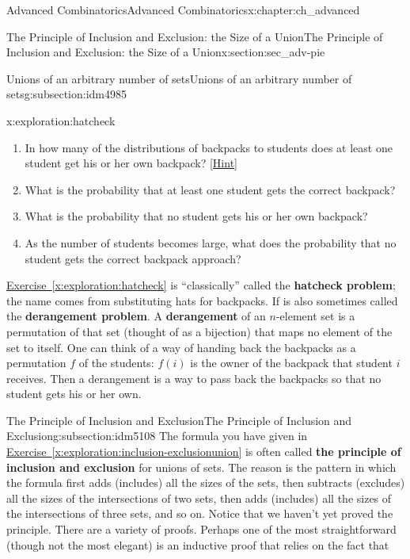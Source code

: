 \documentclass[oneside,10pt,]{book}
\newcommand{\terminology}[1]{\textbf{#1}}
\numberwithin{equation}{chapter}
\begin{document}
\begin{chapterptx}{Advanced Combinatorics}{}{Advanced Combinatorics}{}{}{x:chapter:ch_advanced}
\begin{sectionptx}{The Principle of Inclusion and Exclusion: the Size of a Union}{}{The Principle of Inclusion and Exclusion: the Size of a Union}{}{}{x:section:sec_adv-pie}
\begin{subsectionptx}{Unions of an arbitrary number of sets}{}{Unions of an arbitrary number of sets}{}{}{g:subsection:idm4985}
\begin{exploration}{}{x:exploration:hatcheck}
\begin{enumerate}[font=\bfseries,label=(\alph*),ref=\alph*]
\item{}In how many of the distributions of backpacks to students does at least one student get his or her own backpack?%
\space\hspace*{0pt}\hfill{\tiny\hyperlink{g:hint:idm5038-back}{[Hint]}}\item{}What is the probability that at least one student gets the correct backpack?%
\item\label{x:task:hatcheckprobpart}What is the probability that no student gets his or her own backpack?%
\item{}As the number of students becomes large, what does the probability that no student gets the correct backpack approach?%
\end{enumerate}
\end{exploration}
\hyperref[x:exploration:hatcheck]{Exercise~\ref{x:exploration:hatcheck}} is ``classically'' called the \terminology{hatcheck problem}; the name comes from substituting hats for backpacks. If is also sometimes called the \terminology{derangement problem}. A \terminology{derangement} of an \(n\)-element set is a permutation of that set (thought of as a bijection) that maps no element of the set to itself. One can think of a way of handing back the backpacks as a permutation \(f\) of the students: \(f(i)\) is the owner of the backpack that student \(i\) receives. Then a derangement is a way to pass back the backpacks so that no student gets his or her own.%
\end{subsectionptx}
%
%
\typeout{************************************************}
\typeout{************************************************}
%
\begin{subsectionptx}{The Principle of Inclusion and Exclusion}{}{The Principle of Inclusion and Exclusion}{}{}{g:subsection:idm5108}
The formula you have given in \hyperref[x:exploration:inclusion-exclusionunion]{Exercise~\ref{x:exploration:inclusion-exclusionunion}} is often called \terminology{the principle of inclusion and exclusion} for unions of sets. The reason is the pattern in which the formula first adds (includes) all the sizes of the sets, then subtracts (excludes) all the sizes of the intersections of two sets, then adds (includes) all the sizes of the intersections of three sets, and so on.   Notice that we haven't yet proved the principle. There are a variety of proofs.  Perhaps one of the most straightforward (though not the most elegant) is an inductive proof that relies on the fact that%

\end{subsectionptx}
\end{sectionptx}
\end{chapterptx}
\end{document}
